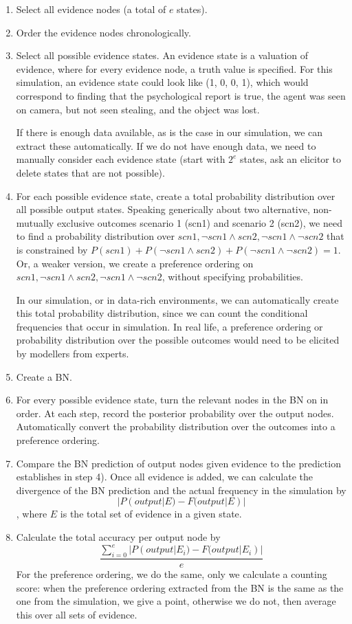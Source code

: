 \documentclass[11pt]{article}
\begin{document}
\begin{enumerate}
\item Select all evidence nodes (a total of $e$ states).
\item Order the evidence nodes chronologically.
\item Select all possible evidence states. An evidence state is a valuation of evidence, where for every evidence node, a truth value is specified. For this simulation, an evidence state could look like (1, 0, 0, 1), which would correspond to finding that the psychological report is true, the agent was seen on camera, but not seen stealing, and the object was lost.

If there is enough data available, as is the case in our simulation, we can extract these automatically. If we do not have enough data, we need to manually consider each evidence state (start with $2^e$ states, ask an elicitor to delete states that are not possible).
\item For each possible evidence state, create a total probability distribution over all possible output states. Speaking generically about two alternative, non-mutually exclusive outcomes scenario 1 (scn1) and scenario 2 (scn2), we need to find a probability distribution over $scn1, \neg scn1 \land scn2, \neg scn1 \land \neg scn2$ that is constrained by $P(scn1) + P(\neg scn1 \land scn2) + P(\neg scn1 \land \neg scn2) = 1$. Or, a weaker version, we create a preference ordering on $scn1, \neg scn1 \land scn2, \neg scn1 \land \neg scn2$, without specifying probabilities. 

In our simulation, or in data-rich environments, we can automatically create this total probability distribution, since we can count the conditional frequencies that occur in simulation. In real life, a preference ordering or probability distribution over the possible outcomes would need to be elicited by modellers from experts.
\item Create a BN.
\item For every possible evidence state, turn the relevant nodes in the BN on in order. At each step, record the posterior probability over the output nodes. Automatically convert the probability distribution over the outcomes into a preference ordering.
\item Compare the BN prediction of output nodes given evidence to the prediction establishes in step 4). Once all evidence is added, we can calculate the divergence of the BN prediction and the actual frequency in the simulation by \[|P(output|E) - F(output|E)|\], where $E$ is the total set of evidence in a given state.
\item Calculate the total accuracy per output node by \[\frac{\sum_{i=0}^{e}|P(output | E_i) - F(output| E_i)|}{e}\] For the preference ordering, we do the same, only we calculate a counting score: when the preference ordering extracted from the BN is the same as the one from the simulation, we give a point, otherwise we do not, then average this over all sets of evidence.
\end{enumerate}
\end{document}
